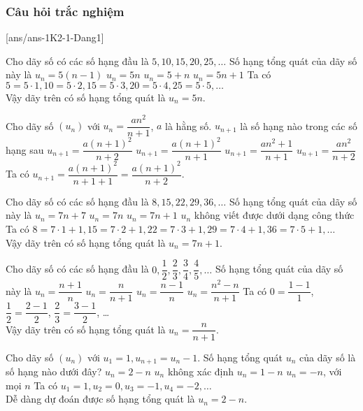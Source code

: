 \subsubsection{Câu hỏi trắc nghiệm}
[ans/ans-1K2-1-Dang1]
\begin{ex}%
	Cho dãy số có các số hạng đầu là $5,10,15,20,25, \ldots$ Số hạng tổng quát của dãy số này là
	\choice
	{$ u_n=5(n-1) $}
	{\True$ u_n=5n $}
	{$ u_n=5+n $}
	{$ u_n=5n+1 $}
	\loigiai
	{Ta có $5=5\cdot 1, 10=5 \cdot 2, 15 = 5\cdot 3, 20=5 \cdot 4, 25 = 5\cdot 5, \ldots$\\
		Vậy dãy trên có số hạng tổng quát là $u_n=5n$.
	}
\end{ex}
\begin{ex}%
	Cho dãy số $(u_n)$ với $u_n=\dfrac{an^2}{n+1}$, $a$ là hằng số. $u_{n+1}$ là số hạng nào trong các số hạng sau
	\choice
	{\True $u_{n+1}=\dfrac{a(n+1)^2}{n+2} $}
	{$u_{n+1}=\dfrac{a(n+1)^2}{n+1}$}
	{$u_{n+1}=\dfrac{an^2+1}{n+1}$}
	{$u_{n+1}=\dfrac{an^2}{n+2} $}
	\loigiai
	{Ta có $u_{n+1}=\dfrac{a(n+1)^2}{n+1+1}=\dfrac{a(n+1)^2}{n+2}$.
	}
\end{ex}
\begin{ex}%
	Cho dãy số có các số hạng đầu là $8,15,22,29,36, \ldots$ Số hạng tổng quát của dãy số này là
	\choice
	{$ u_n=7n+7 $}
	{$ u_n=7n $}
	{\True $ u_n=7n+1 $}
	{$ u_n$ không viết được dưới dạng công thức }
	\loigiai
	{Ta có $8=7\cdot 1+1, 15=7 \cdot 2+1, 22 = 7\cdot 3+1, 29=7 \cdot 4+1, 36 = 7\cdot 5+1, \ldots$\\
		Vậy dãy trên có số hạng tổng quát là $u_n=7n+1$.
	}
\end{ex}
\begin{ex}%
	Cho dãy số có các số hạng đầu là $0,\dfrac{1}{2},\dfrac{2}{3},\dfrac{3}{4},\dfrac{4}{5}, \ldots$ Số hạng tổng quát của dãy số này là
	\choice
	{$ u_n=\dfrac{n+1}{n}$}
	{$ u_n=\dfrac{n}{n+1} $}
	{\True $ u_n=\dfrac{n-1}{n}$}
	{$ u_n=\dfrac{n^2-n}{n+1}$  }
	\loigiai
	{Ta có $0=\dfrac{1-1}{1}$, $\dfrac{1}{2}=\dfrac{2-1}{2}$, $\dfrac{2}{3}=\dfrac{3-1}{2} $, \ldots\\
		Vậy dãy trên có số hạng tổng quát là $u_n=\dfrac{n}{n+1}$.
	}
\end{ex}
\begin{ex}%
	Cho dãy số $(u_n)$ với $u_1=1, u_{n+1}=u_n-1$. Số hạng tổng quát $u_n$ của dãy số là số hạng nào dưới đây?
	\choice
	{\True $ u_n=2-n$}
	{$ u_n$ không xác định}
	{$ u_n=1-n$}
	{$ u_n=-n$, với mọi $n$ }
	\loigiai
	{Ta có $u_1=1, u_2=0 ,u_3 = -1, u_4=-2,  \ldots$\\
		Dễ dàng dự đoán được số hạng tổng quát là $u_n=2-n$.
	}
\end{ex}

